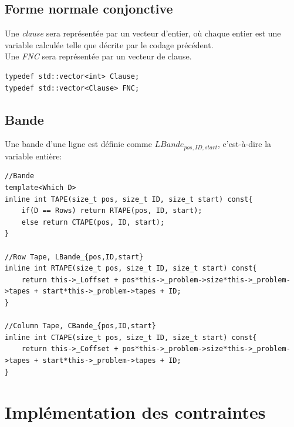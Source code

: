 \documentclass[a4paper,12pt]{report}
\begin{document}
\subsection{Forme normale conjonctive}
Une \textit{clause} sera représentée par un vecteur d'entier, où chaque entier est une variable calculée telle que décrite par le codage précédent.\\
Une \textit{FNC} sera représentée par un vecteur de clause.				
\lstset{style=Cpp, caption=clause et FNC, label=C:FNC_Clause}
\begin{lstlisting}[mathescape=true]	
typedef std::vector<int> Clause;
typedef std::vector<Clause> FNC;
\end{lstlisting}

\subsection{Bande}
Une bande d'une ligne est définie comme $LBande_{pos,ID,start}$, c'est-à-dire la variable entière:
\lstset{style=Cpp, caption=Une bande comme variable, label=C:bande}
\begin{lstlisting}[mathescape=true]
//Bande
template<Which D>
inline int TAPE(size_t pos, size_t ID, size_t start) const{
	if(D == Rows) return RTAPE(pos, ID, start);
	else return CTAPE(pos, ID, start);
}

//Row Tape, LBande_{pos,ID,start}
inline int RTAPE(size_t pos, size_t ID, size_t start) const{
	return this->_Loffset + pos*this->_problem->size*this->_problem->tapes + start*this->_problem->tapes + ID;
}

//Column Tape, CBande_{pos,ID,start}
inline int CTAPE(size_t pos, size_t ID, size_t start) const{
	return this->_Coffset + pos*this->_problem->size*this->_problem->tapes + start*this->_problem->tapes + ID;
}
\end{lstlisting}

\section{Implémentation des contraintes}
\end{document}
